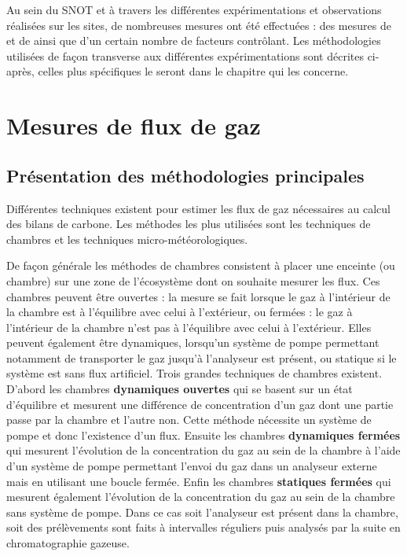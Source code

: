 Au sein du SNOT et à travers les différentes expérimentations et observations réalisées sur les sites, de nombreuses mesures ont été effectuées : des mesures de \coo et de \chh ainsi que d'un certain nombre de facteurs contrôlant.
Les méthodologies utilisées de façon transverse aux différentes expérimentations sont décrites ci-après, celles plus spécifiques le seront dans le chapitre qui les concerne.

\section{Mesures de flux de gaz}
\label{sec:clsd_chbr_method}

\subsection{Présentation des méthodologies principales}


Différentes techniques existent pour estimer les flux de gaz nécessaires au calcul des bilans de carbone.
Les méthodes les plus utilisées sont les techniques de chambres et les techniques micro-météorologiques.

De façon générale les méthodes de chambres consistent à placer une enceinte (ou chambre) sur une zone de l'écosystème dont on souhaite mesurer les flux.
Ces chambres peuvent être ouvertes : la mesure se fait lorsque le gaz à l'intérieur de la chambre est à l'équilibre avec celui à l'extérieur, ou fermées : le gaz à l'intérieur de la chambre n'est pas à l'équilibre avec celui à l'extérieur.
Elles peuvent également être dynamiques, lorsqu'un système de pompe permettant notamment de transporter le gaz jusqu'à l'analyseur est présent, ou statique si le système est sans flux artificiel.
Trois grandes techniques de chambres existent.
D'abord les chambres \textbf{dynamiques ouvertes} qui se basent sur un état d'équilibre et mesurent une différence de concentration d'un gaz dont une partie passe par la chambre et l'autre non. 
Cette méthode nécessite un système de pompe et donc l'existence d'un flux.
Ensuite les chambres \textbf{dynamiques fermées} qui mesurent l'évolution de la concentration du gaz au sein de la chambre à l'aide d'un système de pompe permettant l'envoi du gaz dans un analyseur externe mais en utilisant une boucle fermée.
Enfin les chambres \textbf{statiques fermées} qui mesurent également l'évolution de la concentration du gaz au sein de la chambre sans système de pompe.
Dans ce cas soit l'analyseur est présent dans la chambre, soit des prélèvements sont faits à intervalles réguliers puis analysés par la suite en chromatographie gazeuse.

